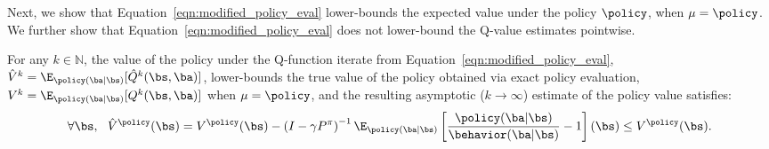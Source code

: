 Next, we show that Equation~\ref{eqn:modified_policy_eval} lower-bounds the expected value under the policy $\policy$, when $\mu = \policy$. We further show that Equation~\ref{eqn:modified_policy_eval} does not lower-bound the Q-value estimates pointwise.
\begin{theorem}
\label{thm:cql_underestimates}
For any $k \in \mathbb{N}$, the value of the policy under the Q-function iterate from Equation~\ref{eqn:modified_policy_eval}, $\hat{V}^k = \E_{\policy(\ba|\bs)}[\hat{Q}^k(\bs, \ba)]$, lower-bounds the true value of the policy obtained via exact policy evaluation, $V^k = \E_{\policy(\ba|\bs)}[Q^k(\bs, \ba)]$ when $\mu = \policy$, 
and the resulting asymptotic ($k \rightarrow \infty$) estimate of the policy value satisfies: 
\begin{equation*}
\forall \bs, ~~ \hat{V}^\policy(\bs) = V^\policy(\bs) - \left(I - \gamma P^\pi \right)^{-1} \E_{\policy(\ba|\bs)}\left[\frac{\policy(\ba|\bs)}{\behavior(\ba|\bs)} - 1 \right](\bs) \leq V^\policy(\bs).    
\end{equation*}
\end{theorem}


